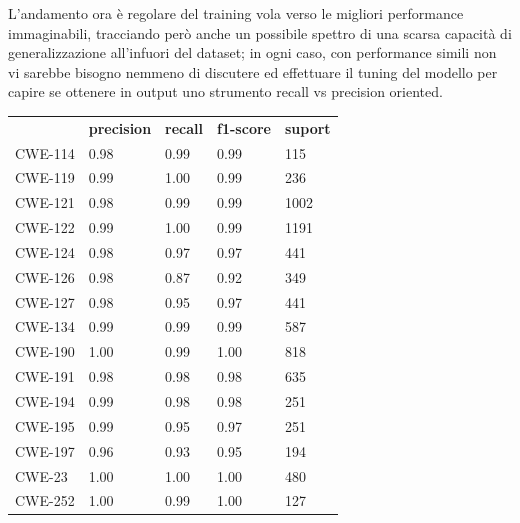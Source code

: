 \documentclass[conference]{IEEEtran}
\begin{document}
L'andamento ora è regolare del training vola verso le migliori performance immaginabili, tracciando però anche un possibile spettro di una scarsa capacità di generalizzazione all'infuori del dataset; in ogni caso, con performance simili non vi sarebbe bisogno nemmeno di discutere ed effettuare il tuning del modello per capire se ottenere in output uno strumento recall vs precision oriented.
%
\begin{table}[h]
\begin{tabular}{lllll}
             & \textbf{precision} & \textbf{recall} & \textbf{f1-score} & \textbf{suport} \\
CWE-114      & 0.98               & 0.99            & 0.99              & 115             \\
CWE-119      & 0.99               & 1.00            & 0.99              & 236             \\
CWE-121      & 0.98               & 0.99            & 0.99              & 1002            \\
CWE-122      & 0.99               & 1.00            & 0.99              & 1191            \\
CWE-124      & 0.98               & 0.97            & 0.97              & 441             \\
CWE-126      & 0.98               & 0.87            & 0.92              & 349             \\
CWE-127      & 0.98               & 0.95            & 0.97              & 441             \\
CWE-134      & 0.99               & 0.99            & 0.99              & 587             \\
CWE-190      & 1.00               & 0.99            & 1.00              & 818             \\
CWE-191      & 0.98               & 0.98            & 0.98              & 635             \\
CWE-194      & 0.99               & 0.98            & 0.98              & 251             \\
CWE-195      & 0.99               & 0.95            & 0.97              & 251             \\
CWE-197      & 0.96               & 0.93            & 0.95              & 194             \\
CWE-23       & 1.00               & 1.00            & 1.00              & 480             \\
CWE-252      & 1.00               & 0.99            & 1.00              & 127             \\

\end{tabular}
\end{table}
\end{document}
